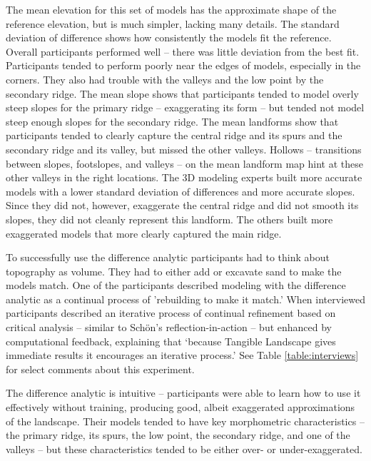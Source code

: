 \documentclass[Afour,sagev,times]{sagej} %
\begin{document}
The mean elevation for this set of models
has the approximate shape of the reference elevation, 
but is much simpler, lacking many details. 
The standard deviation of difference shows 
how consistently the models fit the reference. 
Overall participants performed well -- 
there was little deviation from the best fit. 
Participants tended to perform poorly 
near the edges of models, especially in the corners.
They also had trouble with the valleys 
and the low point by the secondary ridge.
The mean slope shows that participants tended to model 
overly steep slopes for the primary ridge -- exaggerating its form --
but tended not model steep enough slopes for the secondary ridge. 
The mean landforms show that participants tended to 
clearly capture the central ridge and its spurs and
the secondary ridge and its valley, but missed the 
other valleys.
Hollows -- transitions between slopes, footslopes, and valleys -- 
on the mean landform map hint at these other 
valleys in the right locations.
The 3D modeling experts built more accurate models
with a lower standard deviation of differences 
and more accurate slopes. 
Since they did not, however, exaggerate the central ridge
and did not smooth its slopes, 
they did not cleanly represent this landform. 
The others built more exaggerated models 
that more clearly captured the main ridge.

To successfully use the difference analytic 
participants had to think about topography as volume.
They had to either add or excavate sand to make the models match. 
One of the participants 
described modeling with the difference analytic
as a continual process of 'rebuilding to make it match.'
When interviewed
participants described an iterative process of 
continual refinement based on critical analysis 
-- similar to Sch{\"o}n's reflection-in-action \cite{Schon1983} --
but enhanced by computational feedback,
explaining that 
`because Tangible Landscape gives immediate results 
it encourages an iterative process.' 
See Table \ref{table:interviews} for select comments about this experiment.

The difference analytic is intuitive -- 
participants were able to learn how to use it effectively without training, 
producing good, albeit exaggerated approximations of the landscape. 
%
Their models tended to have key morphometric characteristics -- 
the primary ridge, its spurs, the low point, 
the secondary ridge, and one of the valleys -- 
but these characteristics tended to be 
either over- or under-exaggerated.
\end{document}
